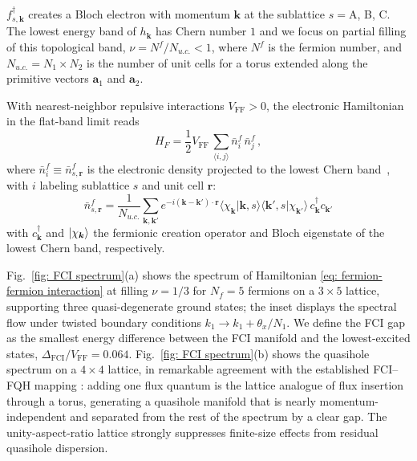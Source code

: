\documentclass[aps,prl,twocolumn,amsmath,amssymb,nofootinbib,superscriptaddress,floatfix]{revtex4-1}
\newcommand{\bs}[1]{{\boldsymbol{#1}}}
\begin{document}
$f^{\dagger}_{s,\bs{k}}$ creates a Bloch electron with momentum $\bs{k}$ at the sublattice $s =$A, B, C. The lowest energy band of $h_{\bs{k}}$ has Chern number $1$ \cite{ohgushi2000spin, green2010isolated} and we focus on {partial} filling of this topological band, {$\nu = N^{f}/N_{u.c.} <1$}, where
$N^{f}$ is the fermion number, and
$N_{u.c.} = N_{1} \times N_{2}$ is the number of unit cells for a torus
extended along the primitive vectors $\bs{a}_1$ and $\bs{a}_2$.


With nearest-neighbor repulsive interactions $V_{\text{FF}} > 0$, the electronic Hamiltonian in the flat-band limit \cite{Neupert-2011,Sheng-2011,Tang-2011,Sun-2011,Regnault2011,LIU2024515}
reads
\begin{equation}
\label{eq: fermion-fermion interaction}
H_{F} = \frac{1}{2}V_{\text{FF}}\,\sum_{\langle i,j\rangle} \bar{n}^{f}_{i}\,\bar{n}^{f}_{j}
\,,
\end{equation}
{where $\bar{n}^{f}_{i} \equiv \bar{n}^{f}_{s,\bs{r}}$ is the electronic density projected to the lowest Chern band~\cite{parameswaran2013fractional}, with $i$ labeling sublattice $s$ and unit cell $\bs{r}$:}
\begin{equation}
\bar{n}^{f}_{s,\bs{r}}
=\frac{1}{N_{u.c.}}
\sum_{\bs{k},\bs{k'}}e^{-i(\bs{k}-\bs{k}')\cdot\bs{r}} \langle\chi_{\bs{k}} |\boldsymbol{k},s\rangle\langle \boldsymbol{k}',s|
\chi_{\bs{k}'}\rangle
\,c^{\dagger}_{\bs{k}} c_{\bs{k}'}
\end{equation}
{with $c^{\dagger}_{\bs{k}}$ and $\ket{\chi_{\bs{k}}}$ the fermionic creation operator and Bloch eigenstate of the lowest Chern band, respectively.}


{Fig.~\ref{fig: FCI spectrum}(a) shows the spectrum of Hamiltonian \eqref{eq: fermion-fermion interaction} at filling $\nu=1/3$ for $N_f = 5$ fermions on a $3 \times 5$ lattice, supporting three quasi-degenerate ground states; the inset displays the spectral flow under twisted boundary conditions $k_1\rightarrow k_1 +\theta_x/N_1$. We define the FCI gap as the smallest energy difference between the FCI manifold and the lowest-excited states, $\Delta_\text{FCI}/V_\text{FF}=0.064$. Fig.~\ref{fig: FCI spectrum}(b) shows the quasihole spectrum on a $4\times4$ lattice, in remarkable agreement with the established FCI--FQH mapping \cite{wu2012zoology,liu2015characterization,liu2013fractional,bernevig2012emergent}: adding one flux quantum is the lattice analogue of flux insertion through a torus, generating a quasihole manifold that is nearly momentum-independent and separated from the rest of the spectrum by a clear gap. The unity-aspect-ratio lattice strongly suppresses finite-size effects from residual quasihole dispersion.}
\end{document}
